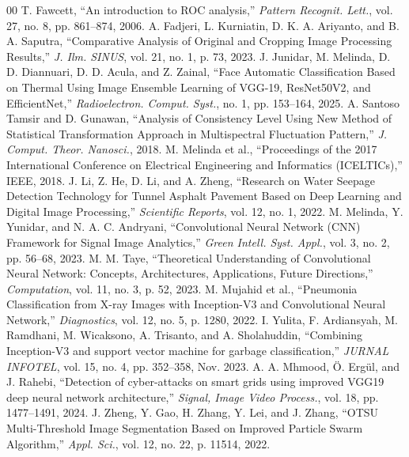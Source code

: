 \documentclass[conference]{IEEEtran}
\begin{document}
\begin{thebibliography}{00}
 T. Fawcett, ``An introduction to ROC analysis,'' \emph{Pattern Recognit. Lett.}, vol. 27, no. 8, pp. 861--874, 2006.
 A. Fadjeri, L. Kurniatin, D. K. A. Ariyanto, and B. A. Saputra, ``Comparative Analysis of Original and Cropping Image Processing Results,'' \emph{J. Ilm. SINUS}, vol. 21, no. 1, p. 73, 2023.
 J. Junidar, M. Melinda, D. D. Diannuari, D. D. Acula, and Z. Zainal, ``Face Automatic Classification Based on Thermal Using Image Ensemble Learning of VGG-19, ResNet50V2, and EfficientNet,'' \emph{Radioelectron. Comput. Syst.}, no. 1, pp. 153--164, 2025.
 A. Santoso Tamsir and D. Gunawan, ``Analysis of Consistency Level Using New Method of Statistical Transformation Approach in Multispectral Fluctuation Pattern,'' \emph{J. Comput. Theor. Nanosci.}, 2018.
 M. Melinda et al., ``Proceedings of the 2017 International Conference on Electrical Engineering and Informatics (ICELTICs),'' IEEE, 2018.
 J. Li, Z. He, D. Li, and A. Zheng, ``Research on Water Seepage Detection Technology for Tunnel Asphalt Pavement Based on Deep Learning and Digital Image Processing,'' \emph{Scientific Reports}, vol. 12, no. 1, 2022.
 M. Melinda, Y. Yunidar, and N. A. C. Andryani, ``Convolutional Neural Network (CNN) Framework for Signal Image Analytics,'' \emph{Green Intell. Syst. Appl.}, vol. 3, no. 2, pp. 56--68, 2023.
 M. M. Taye, ``Theoretical Understanding of Convolutional Neural Network: Concepts, Architectures, Applications, Future Directions,'' \emph{Computation}, vol. 11, no. 3, p. 52, 2023.
 M. Mujahid et al., ``Pneumonia Classification from X-ray Images with Inception-V3 and Convolutional Neural Network,'' \emph{Diagnostics}, vol. 12, no. 5, p. 1280, 2022.
 I. Yulita, F. Ardiansyah, M. Ramdhani, M. Wicaksono, A. Trisanto, and A. Sholahuddin, ``Combining Inception-V3 and support vector machine for garbage classification,'' \emph{JURNAL INFOTEL}, vol. 15, no. 4, pp. 352--358, Nov. 2023.
 A. A. Mhmood, Ö. Ergül, and J. Rahebi, ``Detection of cyber-attacks on smart grids using improved VGG19 deep neural network architecture,'' \emph{Signal, Image Video Process.}, vol. 18, pp. 1477--1491, 2024.
 J. Zheng, Y. Gao, H. Zhang, Y. Lei, and J. Zhang, ``OTSU Multi-Threshold Image Segmentation Based on Improved Particle Swarm Algorithm,'' \emph{Appl. Sci.}, vol. 12, no. 22, p. 11514, 2022.
\end{thebibliography}
\end{document}
